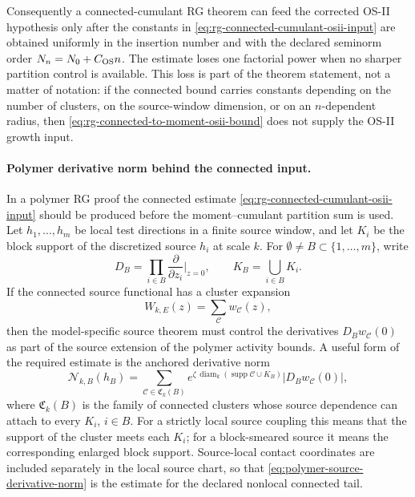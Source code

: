 Consequently a connected-cumulant RG theorem can feed the corrected OS-II
hypothesis only after the constants in
\eqref{eq:rg-connected-cumulant-osii-input} are obtained uniformly in the
insertion number and with the declared seminorm order \(N_n=N_0+C_{\rm OS}n\).
The estimate loses one factorial power when no sharper partition control is
available.  This loss is part of the theorem statement, not a matter of
notation: if the connected bound carries constants depending on the number
of clusters, on the source-window dimension, or on an \(n\)-dependent radius,
then \eqref{eq:rg-connected-to-moment-osii-bound} does not supply the OS-II
growth input.

\paragraph{Polymer derivative norm behind the connected input.}
In a polymer RG proof the connected estimate
\eqref{eq:rg-connected-cumulant-osii-input} should be produced before the
moment--cumulant partition sum is used.  Let \(h_1,\ldots,h_m\) be local test
directions in a finite source window, and let \(K_i\) be the block support of
the discretized source \(h_i\) at scale \(k\).  For
\(\emptyset\ne B\subset\{1,\ldots,m\}\), write
\[
  D_B=\prod_{i\in B}\frac{\partial}{\partial z_i}\bigg|_{z=0},
  \qquad
  K_B=\bigcup_{i\in B}K_i .
\]
If the connected source functional has a cluster expansion
\[
  W_{k,E}(z)=\sum_{\mathcal C}w_{\mathcal C}(z),
\]
then the model-specific source theorem must control the derivatives
\(D_Bw_{\mathcal C}(0)\) as part of the source extension of the polymer
activity bounds.  A useful form of the required estimate is the anchored
derivative norm
\begin{equation}
  \mathcal N_{k,B}(h_B)
  =
  \sum_{\mathcal C\in\mathfrak C_k(B)}
  e^{\zeta\,\operatorname{diam}_k(
    \operatorname{supp}\mathcal C\cup K_B)}
  \left|D_Bw_{\mathcal C}(0)\right|,
  \label{eq:polymer-source-derivative-norm}
\end{equation}
where \(\mathfrak C_k(B)\) is the family of connected clusters whose source
dependence can attach to every \(K_i\), \(i\in B\).  For a strictly local
source coupling this means that the support of the cluster meets each
\(K_i\); for a block-smeared source it means the corresponding enlarged block
support.  Source-local contact coordinates are included separately in the
local source chart, so that
\eqref{eq:polymer-source-derivative-norm} is the estimate for the declared
nonlocal connected tail.


